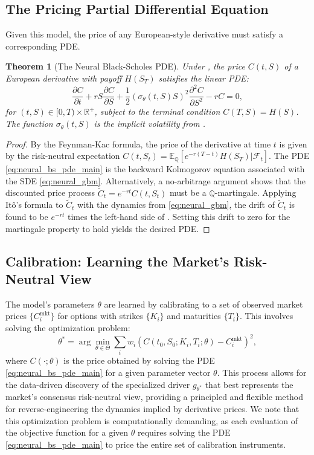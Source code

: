\documentclass[qian]{imsart}
\newcommand{\R}{\mathbb{R}}
\newcommand{\Qbb}{\mathbb{Q}}
\newcommand{\E}{\mathbb{E}}
\newcommand{\Fcal}{\mathcal{F}}
\theoremstyle{plain}
\newtheorem{theorem}{Theorem}[section]
\theoremstyle{definition}
\begin{document}
\subsection{The Pricing Partial Differential Equation}
Given this model, the price of any European-style derivative must satisfy a corresponding PDE.

\begin{theorem}[The Neural Black-Scholes PDE]
\label{thm:neural_bs_pde}
Under , the price $C(t,S)$ of a European derivative with payoff $H(S_T)$ satisfies the linear PDE:
\begin{equation}
\label{eq:neural_bs_pde_main}
    \frac{\partial C}{\partial t} + rS \frac{\partial C}{\partial S} + \frac{1}{2}(\sigma_\theta(t, S)S)^2 \frac{\partial^2 C}{\partial S^2} - rC = 0,
\end{equation}
for $(t,S) \in [0,T) \times \R^+$, subject to the terminal condition $C(T,S) = H(S)$. The function $\sigma_\theta(t,S)$ is the implicit volatility from .
\end{theorem}

\begin{proof}
By the Feynman-Kac formula, the price of the derivative at time $t$ is given by the risk-neutral expectation $C(t,S_t) = \E_\Qbb[e^{-r(T-t)}H(S_T) | \Fcal_t]$. The PDE \eqref{eq:neural_bs_pde_main} is the backward Kolmogorov equation associated with the SDE \eqref{eq:neural_gbm}. Alternatively, a no-arbitrage argument shows that the discounted price process $\tilde{C}_t = e^{-rt}C(t,S_t)$ must be a $\Qbb$-martingale. Applying Itô's formula to $\tilde{C}_t$ with the dynamics from \eqref{eq:neural_gbm}, the drift of $\tilde{C}_t$ is found to be $e^{-rt}$ times the left-hand side of . Setting this drift to zero for the martingale property to hold yields the desired PDE.
\end{proof}

\subsection{Calibration: Learning the Market's Risk-Neutral View}
The model's parameters $\theta$ are learned by calibrating to a set of observed market prices $\{C^{\text{mkt}}_i\}$ for options with strikes $\{K_i\}$ and maturities $\{T_i\}$. This involves solving the optimization problem:
\begin{equation}
\label{eq:calibration_loss}
    \theta^* = \arg\min_{\theta \in \Theta} \sum_i w_i \left( C(t_0, S_0; K_i, T_i; \theta) - C^{\text{mkt}}_i \right)^2,
\end{equation}
where $C(\cdot; \theta)$ is the price obtained by solving the PDE \eqref{eq:neural_bs_pde_main} for a given parameter vector $\theta$. This process allows for the data-driven discovery of the specialized driver $g_{\theta^*}$ that best represents the market's consensus risk-neutral view, providing a principled and flexible method for reverse-engineering the dynamics implied by derivative prices. We note that this optimization problem is computationally demanding, as each evaluation of the objective function for a given $\theta$ requires solving the PDE \eqref{eq:neural_bs_pde_main} to price the entire set of calibration instruments.
\end{document}
